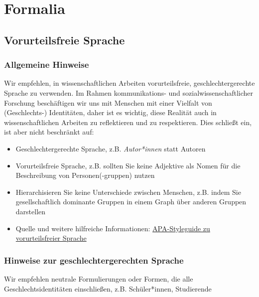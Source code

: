 \documentclass[
  letterpaper,
  DIV=11]{scrreprt}
\begin{document}
\hypertarget{formalia}{%
\chapter{Formalia}\label{formalia}}

\hypertarget{vorurteilsfreie-sprache}{%
\section{Vorurteilsfreie Sprache}\label{vorurteilsfreie-sprache}}

\hypertarget{allgemeine-hinweise-1}{%
\subsection{Allgemeine Hinweise}\label{allgemeine-hinweise-1}}

Wir empfehlen, in wissenschaftlichen Arbeiten vorurteilsfreie,
geschlechtergerechte Sprache zu verwenden. Im Rahmen kommunikations- und
sozialwissenschaftlicher Forschung beschäftigen wir uns mit Menschen mit
einer Vielfalt von (Geschlechts-) Identitäten, daher ist es wichtig,
diese Realität auch in wissenschaftlichen Arbeiten zu reflektieren und
zu respektieren. Dies schließt ein, ist aber nicht beschränkt auf:

\begin{itemize}
\item
  Geschlechtergerechte Sprache, z.B. \emph{Autor*innen} statt Autoren
\item
  Vorurteilsfreie Sprache, z.B. sollten Sie keine Adjektive als Nomen
  für die Beschreibung von Personen(-gruppen) nutzen
\item
  Hierarchisieren Sie keine Unterschiede zwischen Menschen, z.B. indem
  Sie gesellschaftlich dominante Gruppen in einem Graph über anderen
  Gruppen darstellen
\item
  Quelle und weitere hilfreiche Informationen:
  \href{https://apastyle.apa.org/style-grammar-guidelines/bias-free-language/general-principles}{APA-Styleguide
  zu vorurteilsfreier Sprache}
\end{itemize}

\hypertarget{hinweise-zur-geschlechtergerechten-sprache}{%
\subsection{Hinweise zur geschlechtergerechten
Sprache}\label{hinweise-zur-geschlechtergerechten-sprache}}

Wir empfehlen neutrale Formulierungen oder Formen, die alle
Geschlechtsidentitäten einschließen, z.B. Schüler*innen, Studierende
\end{document}
